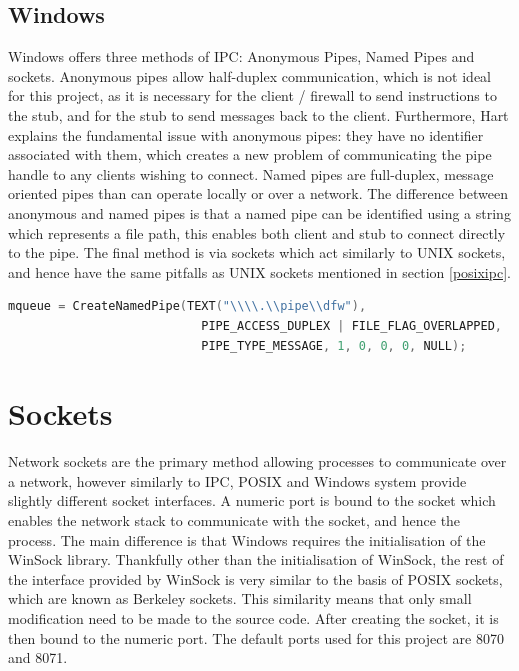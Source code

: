 \documentclass[a4paper, 11pt]{report}
\begin{document}
\subsection{Windows}
Windows\cite{windows} offers three methods of \acrshort{IPC}: Anonymous Pipes, Named Pipes and sockets. Anonymous pipes allow half-duplex communication, which is not ideal for this project, as it is necessary for the client / firewall to send instructions to the \gls{stub}, and for the \gls{stub} to send messages back to the client. Furthermore, Hart\cite{windowsprog} explains the fundamental issue with anonymous pipes: they have no identifier associated with them, which creates a new problem of communicating the pipe handle to any clients wishing to connect. Named pipes are full-duplex, message oriented pipes than can operate locally or over a network. The difference between anonymous and named pipes is that a named pipe can be identified using a string which represents a file path, this enables both client and \gls{stub} to connect directly to the pipe. The final method is via sockets which act similarly to UNIX sockets, and hence have the same pitfalls as UNIX sockets mentioned in section \ref{posixipc}.\\

\begin{lstlisting}[language=c,style=c,caption=Creating the message queue on Windows]
mqueue = CreateNamedPipe(TEXT("\\\\.\\pipe\\dfw"),
                           PIPE_ACCESS_DUPLEX | FILE_FLAG_OVERLAPPED,
                           PIPE_TYPE_MESSAGE, 1, 0, 0, 0, NULL);
\end{lstlisting}

\section{Sockets}
Network sockets are the primary method allowing processes to communicate over a network, however similarly to \acrshort{IPC}, \acrshort{POSIX} and Windows system provide slightly different socket interfaces. A numeric port is bound to the socket which enables the network stack to communicate with the socket, and hence the process. The main difference is that Windows requires the initialisation of the WinSock\cite{winsock} library. Thankfully other than the initialisation of WinSock, the rest of the interface provided by WinSock is very similar to the basis of \acrshort{POSIX} sockets, which are known as Berkeley sockets. This similarity means that only small modification need to be made to the source code. After creating the socket, it is then bound to the numeric port. The default ports used for this project are 8070 and 8071.
\end{document}
